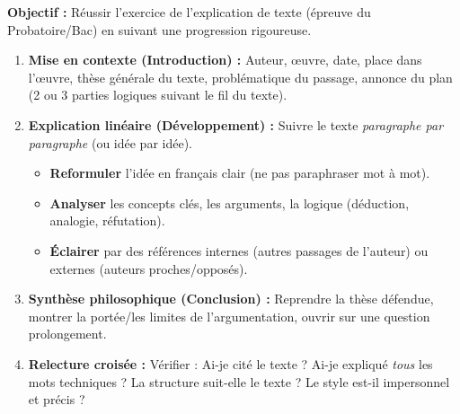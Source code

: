 \documentclass[11pt]{article}
\begin{document}
\begin{methode}
\textbf{Objectif :} Réussir l'exercice de l'explication de texte (épreuve du Probatoire/Bac) en suivant une progression rigoureuse.
\begin{enumerate}
    \item \textbf{Mise en contexte (Introduction) :} Auteur, œuvre, date, place dans l'œuvre, thèse générale du texte, problématique du passage, annonce du plan (2 ou 3 parties logiques suivant le fil du texte).
    \item \textbf{Explication linéaire (Développement) :} Suivre le texte \emph{paragraphe par paragraphe} (ou idée par idée).
        \begin{itemize}
            \item \textbf{Reformuler} l'idée en français clair (ne pas paraphraser mot à mot).
            \item \textbf{Analyser} les concepts clés, les arguments, la logique (déduction, analogie, réfutation).
            \item \textbf{Éclairer} par des références internes (autres passages de l'auteur) ou externes (auteurs proches/opposés).
        \end{itemize}
    \item \textbf{Synthèse philosophique (Conclusion) :} Reprendre la thèse défendue, montrer la portée/les limites de l'argumentation, ouvrir sur une question prolongement.
    \item \textbf{Relecture croisée :} Vérifier : Ai-je cité le texte ? Ai-je expliqué \emph{tous} les mots techniques ? La structure suit-elle le texte ? Le style est-il impersonnel et précis ?
\end{enumerate}
\end{methode}
\end{document}
